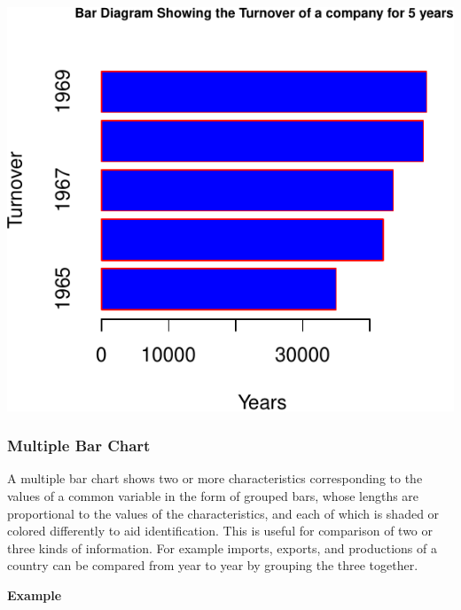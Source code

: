 \documentclass[]{article}
\begin{document}
\includegraphics{chapt2_files/figure-latex/simple bar chart horizontal-1.pdf}

\hypertarget{multiple-bar-chart}{%
\subsubsection{Multiple Bar Chart}\label{multiple-bar-chart}}

A multiple bar chart shows two or more characteristics corresponding to
the values of a common variable in the form of grouped bars, whose
lengths are proportional to the values of the characteristics, and each
of which is shaded or colored differently to aid identification. This is
useful for comparison of two or three kinds of information. For example
imports, exports, and productions of a country can be compared from year
to year by grouping the three together.

\textbf{Example}
\end{document}

